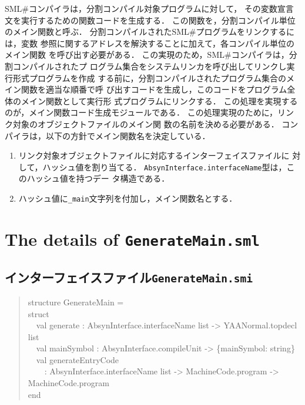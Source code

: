 \documentclass{jbook}
\newcommand{\txt}[2]{#2}
\newcommand{\smlsharp}{SML\#}
\newcommand{\code}[1]{\mbox{\large\tt #1}}
\newcommand{\myem}{\mbox{\ \ }}
\newenvironment{program}{\begin{quote}\begin{tt}}%
                        {\end{tt}\end{quote}}
\begin{document}
	\smlsharp{}コンパイラは，分割コンパイル対象プログラムに対して，
その変数宣言文を実行するための関数コードを生成する．
	この関数を，分割コンパイル単位のメイン関数と呼ぶ．
	分割コンパイルされた\smlsharp{}プログラムをリンクするには，変数
参照に関するアドレスを解決することに加えて，各コンパイル単位のメイン関数
を呼び出す必要がある．
	この実現のため，\smlsharp{}コンパイラは，分割コンパイルされたプ
ログラム集合をシステムリンカを呼び出してリンクし実行形式プログラムを作成
する前に，分割コンパイルされたプログラム集合のメイン関数を適当な順番で呼
び出すコードを生成し，このコードをプログラム全体のメイン関数として実行形
式プログラムにリンクする．
	この処理を実現するのが，メイン関数コード生成モジュールである．
	この処理実現のために，リンク対象のオブジェクトファイルのメイン関
数の名前を決める必要がある．
	コンパイラは，以下の方針でメイン関数名を決定している．
\begin{enumerate}
\item リンク対象オブジェクトファイルに対応するインターフェイスファイルに
対して，ハッシュ値を割り当てる．
	\code{AbsynInterface.interfaceName}型は，このハッシュ値を持つデー
タ構造である．
\item ハッシュ値に\code{\_main}文字列を付加し，メイン関数名とする．
\end{enumerate}

\else%
\fi%
	
\section{\txt{\code{GenerateMain.sml}ファイルの詳細}{The details of \code{GenerateMain.sml}}}
\ifjp%

\subsection{インターフェイスファイル\code{GenerateMain.smi}}
\begin{program}
structure GenerateMain = \\
struct\\
\myem  val generate : AbsynInterface.interfaceName list -> YAANormal.topdecl list\\
\myem  val mainSymbol : AbsynInterface.compileUnit -> \{mainSymbol: string\}\\
\myem  val generateEntryCode\\
\myem\myem    : AbsynInterface.interfaceName list -> MachineCode.program -> MachineCode.program\\
end
\end{program}
\end{document}

